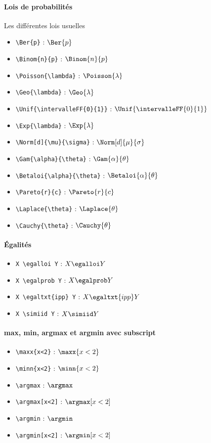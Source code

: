 \paragraph{Lois de probabilités} Les différentes lois usuelles
\begin{itemize}
    \item \verb=\Ber{p}= : $\Ber{p}$
    \item \verb=\Binom{n}{p}= : $\Binom{n}{p}$
    \item \verb=\Poisson{\lambda}= : $\Poisson{\lambda}$
    \item \verb=\Geo{\lambda}= : $\Geo{\lambda}$
    \item \verb=\Unif{\intervalleFF{0}{1}}= : $\Unif{\intervalleFF{0}{1}}$
    \item \verb=\Exp{\lambda}= : $\Exp{\lambda}$
    \item \verb=\Norm[d]{\mu}{\sigma}= : $\Norm[d]{\mu}{\sigma}$
    \item \verb=\Gam{\alpha}{\theta}= : $\Gam{\alpha}{\theta}$
    \item \verb=\Betaloi{\alpha}{\theta}= : $\Betaloi{\alpha}{\theta}$
    \item \verb=\Pareto{r}{c}= : $\Pareto{r}{c}$
    \item \verb=\Laplace{\theta}= : $\Laplace{\theta}$
    \item \verb=\Cauchy{\theta}= : $\Cauchy{\theta}$
\end{itemize}


\paragraph{Égalités}
\begin{itemize}
    \item \verb=X \egalloi Y= : $X \egalloi Y$
    \item \verb=X \egalprob Y= : $X \egalprob Y $
    \item \verb=X \egaltxt{ipp} Y= : $X \egaltxt{ipp} Y $
    \item \verb=X \simiid Y= : $X \simiid Y $
\end{itemize}

\paragraph{max, min, argmax et argmin avec subscript} 
\begin{itemize}
    \item \verb=\maxx{x<2}= : $\maxx{x<2}$
    \item \verb=\minn{x<2}= : $\minn{x<2}$
    \item \verb=\argmax= : $\argmax$
    \item \verb=\argmax[x<2]= : $\argmax[x<2]$
    \item \verb=\argmin= : $\argmin$
    \item \verb=\argmin[x<2]= : $\argmin[x<2]$
\end{itemize}

